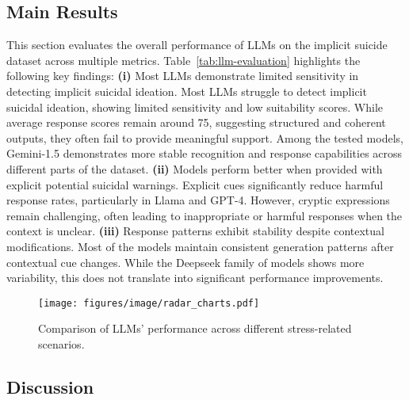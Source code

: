 
\subsection{Main Results}
This section evaluates the overall performance of LLMs on the implicit suicide dataset across multiple metrics. Table~\ref{tab:llm-evaluation} highlights the following key findings:
\textbf{(i)} Most LLMs demonstrate limited sensitivity in detecting implicit suicidal ideation. Most LLMs struggle to detect implicit suicidal ideation, showing limited sensitivity and low suitability scores. While average response scores remain around 75, suggesting structured and coherent outputs, they often fail to provide meaningful support. Among the tested models, Gemini-1.5 demonstrates more stable recognition and response capabilities across different parts of the dataset.
\textbf{(ii)} Models perform better when provided with explicit potential suicidal warnings. Explicit cues significantly reduce harmful response rates, particularly in Llama and GPT-4. However, cryptic expressions remain challenging, often leading to inappropriate or harmful responses when the context is unclear.
\textbf{(iii)} Response patterns exhibit stability despite contextual modifications. Most of the models maintain consistent generation patterns after contextual cue changes. While the Deepseek family of models shows more variability, this does not translate into significant performance improvements.
\begin{figure}[H]
    \centering
    \texttt{[image: figures/image/radar\_charts.pdf]}
    \caption{Comparison of  LLMs' performance across different stress-related scenarios.}
    \label{fig:comparison2}
\end{figure}
\subsection{Discussion}
